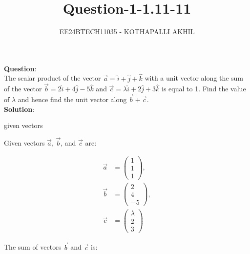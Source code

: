 \documentclass[journal]{IEEEtran}
\numberwithin{figure}{enumi}
\begin{document}

\title{Question-1-1.11-11}
\author{EE24BTECH11035 - KOTHAPALLI AKHIL}
{\let\newpage\relax\maketitle}
\vspace{-10mm}
\textbf{Question}:\\
The scalar product of the vector $\vec{a}=\hat{i}+\hat{j}+\hat{k}$ with a unit vector along the sum of the vector $\vec{b}=2\hat{i}+4\hat{j}-5\hat{k}$ and $\vec{c}=\lambda\hat{i}+2\hat{j}+3\hat{k}$ is equal to 1. Find the  value of $\lambda$ and hence find the  unit vector along $\Vec{b}+\Vec{c}$.\\
\textbf{Solution}:\\
\begin{table}[h!]
   \centering
   
   \caption{given vectors}
   \label{tabQuestion-1-1.11-11}
\end{table}   

Given vectors $\vec{a}$, $\vec{b}$, and $\vec{c}$ are:

\begin{align}
\vec{a} &= \begin{pmatrix} 1 \\ 1 \\ 1 \end{pmatrix}, \\
\vec{b} &= \begin{pmatrix} 2 \\ 4 \\ -5 \end{pmatrix}, \\
\vec{c} &= \begin{pmatrix} \lambda \\ 2 \\ 3 \end{pmatrix}
\end{align}

The sum of vectors $\vec{b}$ and $\vec{c}$ is:
\end{document}

